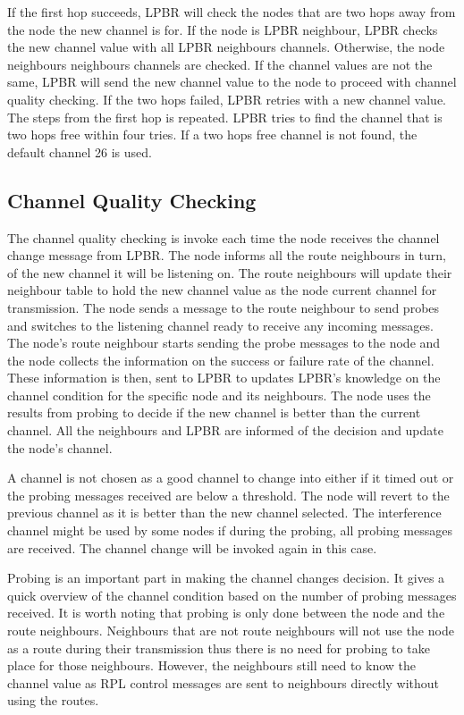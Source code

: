 If the first hop succeeds, LPBR will check the nodes that are two hops away from the node the new channel is for. If the node is LPBR neighbour, LPBR checks the new channel value with all LPBR neighbours channels. Otherwise, the node neighbours neighbours channels are checked. If the channel values are not the same, LPBR will send the new channel value to the node to proceed with channel quality checking. If the two hops failed, LPBR retries with a new channel value. The steps from the first hop is repeated. LPBR tries to find the channel that is two hops free within four tries. If a two hops free channel is not found, the default channel 26 is used.

\subsection{Channel Quality Checking}

The channel quality checking is invoke each time the node receives the channel change message from LPBR. The node informs all the route neighbours in turn, of the new channel it will be listening on. The route neighbours will update their neighbour table to hold the new channel value as the node current channel for transmission. The node sends a message to the route neighbour to send probes and switches to the listening channel ready to receive any incoming messages. The node's route neighbour starts sending the probe messages to the node and the node collects the information on the success or failure rate of the channel. These information is then, sent to LPBR to updates LPBR's knowledge on the channel condition for the specific node and its neighbours. The node uses the results from probing to decide if the new channel is better than the current channel. All the neighbours and LPBR are informed of the decision and update the node's channel.

A channel is not chosen as a good channel to change into either if it timed out or the probing messages received are below a threshold. The node will revert to the previous channel as it is better than the new channel selected. The interference channel might be used by some nodes if during the probing, all probing messages are received. The channel change will be invoked again in this case.

Probing is an important part in making the channel changes decision. It gives a quick overview of the channel condition based on the number of probing messages received. It is worth noting that probing is only done between the node and the route neighbours. Neighbours that are not route neighbours will not use the node as a route during their transmission thus there is no need for probing to take place for those neighbours. However, the neighbours still need to know the channel value as RPL control messages are sent to neighbours directly without using the routes.


